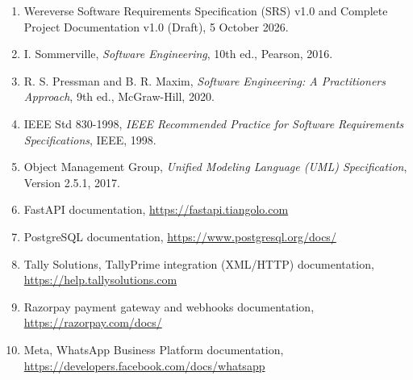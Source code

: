 \documentclass[12pt,a4paper]{article}
\begin{document}
\begin{enumerate}
\def\labelenumi{\arabic{enumi}.}
\item
  Wereverse Software Requirements Specification (SRS) v1.0 and Complete
  Project Documentation v1.0 (Draft), 5 October 2026.
\item
  I. Sommerville, \emph{Software Engineering}, 10th ed., Pearson, 2016.
\item
  R. S. Pressman and B. R. Maxim, \emph{Software Engineering: A
  Practitioner\textquotesingle s Approach}, 9th ed., McGraw-Hill, 2020.
\item
  IEEE Std 830-1998, \emph{IEEE Recommended Practice for Software
  Requirements Specifications}, IEEE, 1998.
\item
  Object Management Group, \emph{Unified Modeling Language (UML)
  Specification}, Version 2.5.1, 2017.
\item
  FastAPI documentation,
  \href{https://fastapi.tiangolo.com/}{https://fastapi.tiangolo.com}
\item
  PostgreSQL documentation, \url{https://www.postgresql.org/docs/}
\item
  Tally Solutions, TallyPrime integration (XML/HTTP) documentation,
  \href{https://help.tallysolutions.com/}{https://help.tallysolutions.com}
\item
  Razorpay payment gateway and webhooks documentation,
  \url{https://razorpay.com/docs/}
\item
  Meta, WhatsApp Business Platform documentation,
  \url{https://developers.facebook.com/docs/whatsapp}
\end{enumerate}
\end{document}
